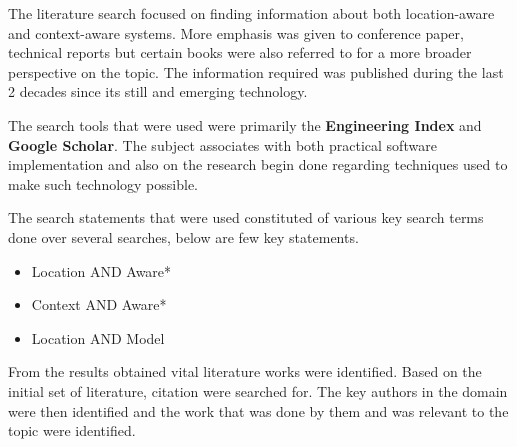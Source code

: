 \documentclass[12pt]{report}
\begin{document}
The literature search focused on finding information about both location-aware and context-aware systems. More emphasis was given to conference paper, technical reports but certain books were also referred to for a more broader perspective on the topic. The information required was published during the last 2 decades since its still and emerging technology.

The search tools that were used were primarily the \textbf{Engineering Index} and \textbf{Google Scholar}. The subject associates with both practical software implementation and also on the research begin done regarding techniques used to make such technology possible. 

The search statements that were used constituted of various key search terms done over several searches, below are few key statements.
\begin{itemize}
\item Location AND Aware*
\item Context AND Aware*
\item Location AND Model
\end{itemize}

From the results obtained vital literature works were identified. Based on the initial set of literature, citation were searched for. The key authors in the domain were then identified and the work that was done by them and was relevant to the topic were identified.
\end{document}
